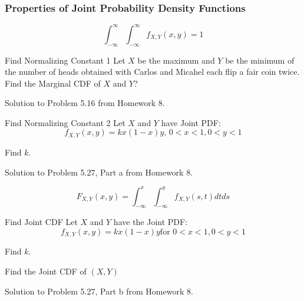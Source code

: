 \subsubsection{Properties of Joint Probability Density Functions}\label{subsubsec:Joint PDF Properties}
\begin{propertylist}
\item
  \begin{equation}
    \int_{-\infty}^{\infty} \int_{-\infty}^{\infty} f_{X,Y} \left( x,y \right) = 1
  \end{equation}
\end{propertylist}
\begin{example}[Example 5.16]{Find Normalizing Constant 1}
  Let $X$ be the maximum and $Y$ be the minimum of the number of heads obtained with Carlos and Micahel each flip a fair coin twice.
  Find the Marginal CDF of $X$ and $Y$?

  \tcblower

  Solution to Problem 5.16 from Homework 8.
\end{example}
\begin{example}[Problem 5.27]{Find Normalizing Constant 2}
  Let $X$ and $Y$ have Joint PDF:
  \begin{equation*}
    f_{X,Y} \left( x,y \right) = k x \left( 1-x \right) y \text{, } 0<x<1, 0<y<1
  \end{equation*}
  \begin{boldalphlist}
  \item Find $k$.
  \end{boldalphlist}

  \tcblower

  Solution to Problem 5.27, Part a from Homework 8.
\end{example}
\begin{propertylist}[resume]
\item
  \begin{equation}
    F_{X,Y} \left( x,y \right) = \int_{-\infty}^{x} \int_{-\infty}^{y} f_{X,Y} \left( s,t \right) dt ds
  \end{equation}
\end{propertylist}
\begin{example}[Problem 5.27]{Find Joint CDF}
  Let $X$ and $Y$ have the Joint PDF:
  \begin{equation*}
    f_{X,Y} \left( x,y \right) = k x \left( 1-x \right) y \text{for } 0<x<1, 0<y<1
  \end{equation*}

  \begin{boldalphlist}
  \item Find $k$.
  \item Find the Joint CDF of $\left( X,Y \right)$
  \end{boldalphlist}

  \tcblower

  Solution to Problem 5.27, Part b from Homework 8.
\end{example}

